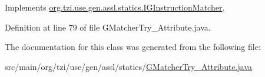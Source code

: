 Implements \hyperlink{interfaceorg_1_1tzi_1_1use_1_1gen_1_1assl_1_1statics_1_1_i_g_instruction_matcher_a2176104f4d4d81361ed45461948e0401}{org.\-tzi.\-use.\-gen.\-assl.\-statics.\-I\-G\-Instruction\-Matcher}.



Definition at line 79 of file G\-Matcher\-Try\-\_\-\-Attribute.\-java.



The documentation for this class was generated from the following file\-:\begin{DoxyCompactItemize}
\item 
src/main/org/tzi/use/gen/assl/statics/\hyperlink{_g_matcher_try___attribute_8java}{G\-Matcher\-Try\-\_\-\-Attribute.\-java}\end{DoxyCompactItemize}

